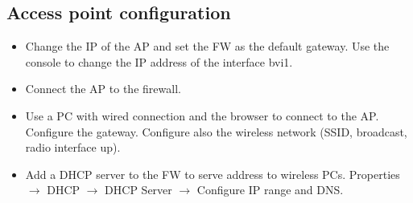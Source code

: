 \subsection{Access point configuration}
\begin{itemize}
\item Change the IP of the AP and set the FW as the default gateway. Use the console to change the IP address of the interface bvi1.
\item Connect the AP to the firewall.
\item Use a PC with wired connection and the browser to connect to the AP. Configure the gateway. Configure also the wireless network (SSID, broadcast, radio interface up).
\item Add a DHCP server to the FW to serve address to wireless PCs. Properties $\rightarrow$ DHCP $\rightarrow$ DHCP Server $\rightarrow$ Configure IP range and DNS.
\end{itemize}
